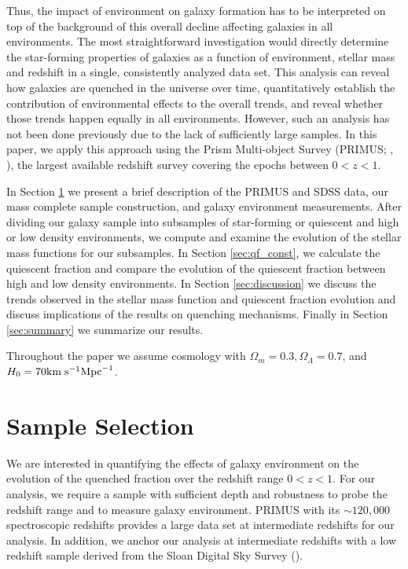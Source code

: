 \documentclass{emulateapj}
\begin{document}
Thus, the impact of environment on galaxy formation has to be
interpreted on top of the background of this overall decline affecting
galaxies in all environments. The most straightforward investigation
would directly determine the star-forming properties of galaxies as
a function of environment, stellar mass and redshift in a single,
consistently analyzed data set. This analysis can reveal how galaxies
are quenched in the universe over time, quantitatively establish the
contribution of environmental effects to the overall trends, and
reveal whether those trends happen equally in all environments.
However, such an analysis has not been done previously due to the lack
of sufficiently large samples. In this paper, we apply this approach
using the Prism Multi-object Survey (PRIMUS; \cite{Coil:2011aa}, 
\cite{Cool:2013aa}), the largest available redshift survey covering the epochs
between $0<z<1$.

In Section \ref{sec:sample} we present a brief description of the PRIMUS and SDSS data, our mass complete sample construction, and galaxy environment measurements. After dividing our galaxy sample into subsamples of star-forming or quiescent and high or low density environments, we compute and examine the evolution of the stellar mass functions for our subsamples. In Section \ref{sec:qf_const}, we calculate the quiescent fraction and compare the evolution of the quiescent fraction between high and low density environments. In Section \ref{sec:discussion} we discuss the trends observed in the stellar mass function and quiescent fraction evolution and discuss implications of the results on quenching mechanisms. Finally in Section \ref{sec:summary} we summarize our results. 

Throughout the paper we assume cosmology with $\Omega_{m} = 0.3, \Omega_{\Lambda} = 0.7$, and $H_0 = 70 \rm{km} \; \rm{s}^{-1} \rm{Mpc}^{-1}$.
\section{Sample Selection} \label{sec:sample}
We are interested in quantifying the effects of galaxy environment on the evolution of the quenched fraction over the redshift range $0 < z < 1$. For our analysis, we require a sample with sufficient depth and robustness to probe the redshift range and to measure galaxy environment. PRIMUS with its $\sim 120,000$ spectroscopic redshifts provides a large data set at intermediate redshifts for our analysis. In addition, we anchor our analysis at intermediate redshifts with a low redshift sample derived from the Sloan Digital Sky Survey (\cite{York:2000aa}). 
\end{document}
